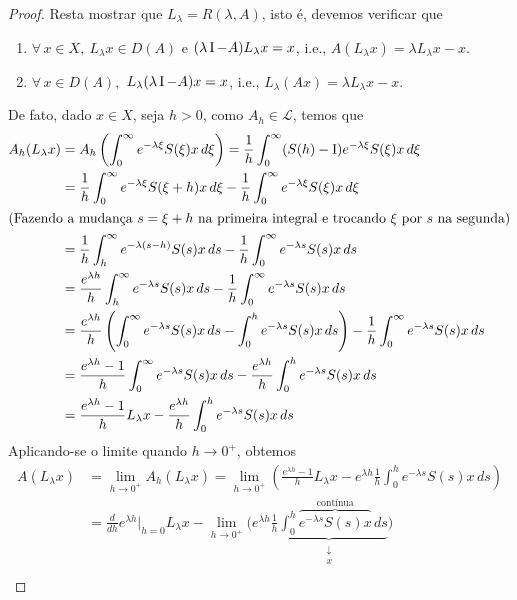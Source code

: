 \begin{proof}
Resta mostrar que  $L_\lambda= R(\lambda,A)$, isto é, devemos verificar que
\begin{enumerate}
\item $\forall\, x\in X,\ L_\lambda x\in D(A)$ e $(\lambda \operatorname{I}-A)L_\lambda x=x$, i.e., $A\left(L_\lambda x\right)=\lambda L_\lambda x -x$.
\item $\forall\, x\in D(A),$ $L_\lambda(\lambda \operatorname{I}-A)x=x$, i.e., $L_\lambda(Ax)=\lambda L_\lambda x-x$.
\end{enumerate}

De fato, dado $x\in X$, seja $h>0$, como $A_h\in \mathcal{L}$, temos que
\begin{align*}
A_h(L_\lambda x)& =A_h\left(\int_0^\infty e^{-\lambda \xi}S(\xi)x\, d\xi\right)
=\frac{1}{h}\int_0^\infty (S(h)-\operatorname{I}) e^{-\lambda \xi}S(\xi)x\, d\xi\\
&= \frac{1}{h}\int_0^\infty e^{-\lambda \xi}S(\xi+h)x\, d\xi- 
\frac{1}{h}\int_0^\infty e^{-\lambda \xi}S(\xi)x\, d\xi\\
\shortintertext{(Fazendo a mudança $s=\xi+h$ na primeira integral e trocando $\xi$ por $s$ na segunda)}
& = \frac{1}{h}\int_h^\infty e^{-\lambda (s-h)}S(s)x\, ds- 
\frac{1}{h}\int_0^\infty e^{-\lambda s}S(s)x\, ds\\
& = \frac{e^{\lambda h}}{h}\int_h^\infty e^{-\lambda s}S(s)x\, ds- 
\frac{1}{h}\int_0^\infty e^{-\lambda s}S(s)x\, ds\\
& = \frac{e^{\lambda h}}{h}\left(\int_0^\infty e^{-\lambda s}S(s)x\, ds
-\int_0^h e^{-\lambda s}S(s)x\, ds\right)- 
\frac{1}{h}\int_0^\infty e^{-\lambda s}S(s)x\, ds\\
& = \frac{e^{\lambda h}-1}{h}\int_0^\infty e^{-\lambda s}S(s)x\, ds
-\frac{e^{\lambda h}}{h}\int_0^h e^{-\lambda s}S(s)x\, ds\\
&= \frac{e^{\lambda h}-1}{h}L_\lambda x
-\frac{e^{\lambda h}}{h}\int_0^h e^{-\lambda s}S(s)x\, ds
\end{align*}
Aplicando-se o limite quando $h\to0^+$, obtemos
\begin{align*}
A\left(L_\lambda x\right)&=\lim_{h\to0^+}A_h(L_\lambda x) =\lim_{h\to0^+}\left(\frac{e^{\lambda h}-1}{h}
L_\lambda x-e^{\lambda h}\frac{1}{h}\int_0^h
e^{-\lambda s}S(s)x\, ds\right)\\
& =\frac{d}{dh}e^{\lambda h}\Big\vert_{h=0}
L_\lambda x-\lim_{h\to0^+}
\bigg(e^{\lambda h}\underbrace{\frac{1}{h}\int_0^h
\overbrace{e^{-\lambda s}S(s)x}^{\text{contínua}}\,
 ds}_{\substack{\downarrow \\ x}}\bigg)\\[-1em]

\end{align*}
\end{proof}
